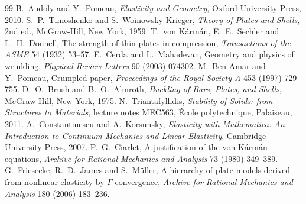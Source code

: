 \label{sec:pl-exo}

\begin{chapterbib}{99}
 B.~Audoly and Y.~Pomeau, \emph{Elasticity and Geometry}, Oxford University Press, 2010.
 S.~P.~Timoshenko and S.~Woinowsky-Krieger, \emph{Theory of Plates and Shells}, 2nd ed., McGraw-Hill, New York, 1959.
 T.~von K\'arm\'an, E.~E.~Sechler and L.~H.~Donnell, The strength of thin plates in compression, \emph{Transactions of the ASME} 54 (1932) 53--57.
 E.~Cerda and L.~Mahadevan, Geometry and physics of wrinkling, \emph{Physical Review Letters} 90 (2003) 074302.
 M.~Ben Amar and Y.~Pomeau, Crumpled paper, \emph{Proceedings of the Royal Society A} 453 (1997) 729--755.
 D.~O.~Brush and B.~O.~Almroth, \emph{Buckling of Bars, Plates, and Shells}, McGraw-Hill, New York, 1975.
 N.~Triantafyllidis, \emph{Stability of Solids: from Structures to Materials}, lecture notes MEC563, \'Ecole polytechnique, Palaiseau, 2011.
 A.~Constantinescu and A.~Korsunsky, \emph{Elasticity with Mathematica: An Introduction to Continuum Mechanics and Linear Elasticity}, Cambridge University Press, 2007.
 P.~G.~Ciarlet, A justification of the von K\'arm\'an equations, \emph{Archive for Rational Mechanics and Analysis} 73 (1980) 349--389.
 G.~Friesecke, R.~D.~James and S.~M\"uller, A hierarchy of plate models derived from nonlinear elasticity by $\Gamma$-convergence, \emph{Archive for Rational Mechanics and Analysis} 180 (2006) 183--236.
\end{chapterbib}
